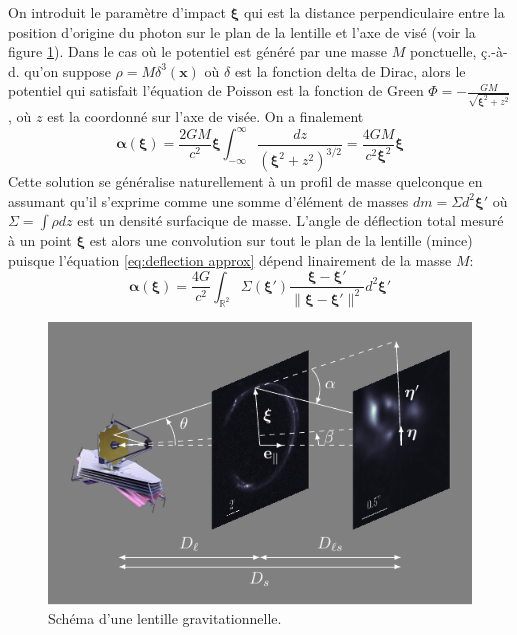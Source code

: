 On introduit le paramètre d'impact $\boldsymbol{\xi}$ qui est la distance perpendiculaire entre 
la position d'origine du photon sur le plan de la lentille  
et l'axe de visé (voir la figure \ref{fig:cartoon}). 
Dans le cas où le potentiel est généré par une masse $M$ ponctuelle, ç.-à-d. qu'on 
suppose $\rho = M\delta^{3}(\mathbf{x})$ où $\delta $ est la fonction delta de Dirac, 
alors le potentiel qui satisfait l'équation de Poisson est 
la fonction de Green 
$\displaystyle \Phi = -\frac{GM}{\sqrt{ \boldsymbol{\xi}^{2} + z^{2}}}$, où $z$ est la coordonné 
sur l'axe de visée. On a finalement 
\begin{equation}\label{eq:deflection approx}
        \boldsymbol{ \alpha}(\boldsymbol{ \xi} ) = \frac{2GM}{c^{2}} \boldsymbol{ \xi}  
        \int_{-\infty }^{\infty } \frac{dz}{(\boldsymbol{ \xi} ^{2} + z^{2})^{3/2}} 
        = \frac{4GM}{c^{2}  \boldsymbol{ \xi}^{2} } \boldsymbol{ \xi}
\end{equation} 
Cette solution se généralise naturellement à un profil de masse quelconque en assumant 
qu'il s'exprime comme une somme d'élément de masses $dm = \Sigma d^{2}\boldsymbol{ \xi}'$ 
où $\Sigma = \int \rho dz$ est un densité surfacique de masse. 
L'angle de déflection total mesuré à un point $\boldsymbol{\xi} $ est alors une convolution 
sur tout le plan de la lentille (mince) puisque l'équation \eqref{eq:deflection approx} dépend 
linairement de la masse $M$:
\begin{equation}\label{eq:alpha physique}
        \boldsymbol{ \alpha} (\boldsymbol{ \xi} ) = \frac{4 G}{c^{2}} 
        \int_{\mathbb{R}^{2}} \Sigma (\boldsymbol{ \xi} ')
        \frac{\boldsymbol{ \xi}  - \boldsymbol{ \xi} '}{\lVert \boldsymbol{ \xi}  - \boldsymbol{ \xi} ' \rVert^{2}}d^{2}\boldsymbol{ \xi} '
\end{equation} 

\begin{figure}[H]
        \centering
        \includegraphics[width=\textwidth]{figures/lensing_cartoon}
        \caption{Schéma d'une lentille gravitationnelle.}
        \label{fig:cartoon}
\end{figure}

